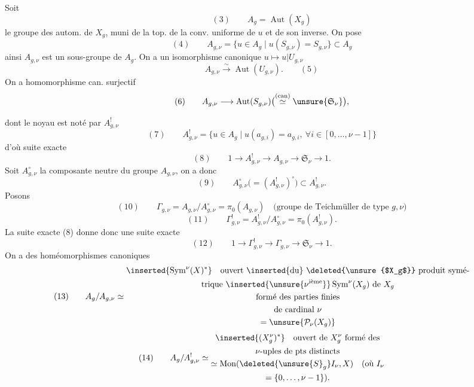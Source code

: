 Soit
\[
(3)\qquad A_g=\operatorname{Aut}(X_g)
\]
le groupe des autom. de $X_g$, muni de la
top. de la conv. uniforme de $u$ et de son
inverse. On pose
\[
(4)\qquad A_{g,\nu}=\{u\in A_g\mid u(S_{g,\nu})=S_{g,\nu}\}\subset A_g
\]
ainsi $A_{g,\nu}$ est un sous-groupe de $A_g$. On
a un isomorphisme canonique $u\mapsto u|U_{g,\nu}$
\[
A_{g,\nu}\xrightarrow{\sim}\operatorname{Aut}(U_{g,\nu}).\qquad(5)
\]
On a  homomorphisme can. surjectif
\[
(6)\qquad A_{g,\nu}\longrightarrow\operatorname{Aut}(S_{g,\nu})
\bigl(\overset{\text{(can)}}{\simeq}\unsure{\mathfrak S_\nu}\bigr),
\]

dont le noyau est noté par $A_{g,\nu}^!$
\[
(7)\qquad A_{g,\nu}^!=\{u\in A_g\mid u(a_{g,i})=a_{g,i},\ \forall i\in[0,\ldots,\nu-1]\}
\]
d'où suite exacte
\[
(8)\qquad 1\longrightarrow A_{g,\nu}^!\longrightarrow A_{g,\nu}
\longrightarrow\mathfrak S_\nu\longrightarrow1.
\]
Soit $A_{g,\nu}^{\circ}$ la composante neutre du groupe
$A_{g,\nu}$, on a donc
\[
(9)\qquad A_{g,\nu}^{\circ}\bigl(=(A_{g,\nu}^!)^{\circ}\bigr)\subset A_{g,\nu}^!.
\]
Posons
\[
(10)\qquad \Gamma_{g,\nu}=A_{g,\nu}/A_{g,\nu}^{\circ}=\pi_0(A_{g,\nu})
\quad\text{(groupe de Teichmüller de type }g,\nu\text{)}
\]
\[
(11)\qquad \Gamma_{g,\nu}^!=A_{g,\nu}^!/A_{g,\nu}^{\circ}=\pi_0(A_{g,\nu}^!).
\]
La suite exacte (8) donne donc une suite
exacte
\[
(12)\qquad 1\longrightarrow\Gamma_{g,\nu}^!\longrightarrow\Gamma_{g,\nu}
\longrightarrow\mathfrak S_\nu\longrightarrow1.
\]
On a des homéomorphismes canoniques
\[
(13)\qquad A_g/A_{g,\nu}\simeq
\begin{gathered}
\inserted{\operatorname{Sym}^{\nu}(X)^*}\quad
\text{ouvert \inserted{du} \deleted{\unsure{$X_g$}} produit symé-}\\
\text{trique }\inserted{\unsure{\nu^{\text{ième}}}}\operatorname{Sym}^{\nu}(X_g)\text{ de }X_g\\
\text{formé des parties finies}\\
\text{de cardinal }\nu\\
=\unsure{\mathcal P_\nu(X_g)}
\end{gathered}
\]
\[
(14)\qquad A_g/A_{g,\nu}^!\simeq
\begin{gathered}
\inserted{(X_g^{\nu})^*}\quad\text{ouvert de }X_g^{\nu}\text{ formé des}\\
\nu\text{-uples de pts distincts}\\
\simeq\operatorname{Mon}(\deleted{\unsure{S}_g}I_\nu,X)\quad\text{(où }I_\nu\\
=\{0,\ldots,\nu-1\}\text{).}
\end{gathered}
\]

